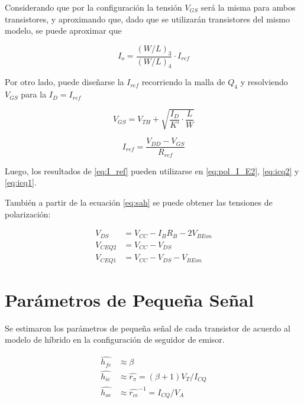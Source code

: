 Considerando que por la configuración la tensión $V_{GS}$ será la misma para ambos transistores, y aproximando que, dado que se utilizarán transistores del mismo modelo, se puede aproximar que 

\begin{equation}
    I_o = \frac{(W/L)_3}{(W/L)_4} \cdot I_{ref}
\end{equation}

Por otro lado, puede diseñarse la $I_{ref}$ recorriendo la malla de $Q_4$ y resolviendo $V_{GS}$ para la $I_D = I_{ref}$

\begin{equation}
    V_{GS} = V_{TH} + \sqrt{\frac{I_D}{K'}\cdot\frac{L}{W}}
\end{equation}

\begin{equation}
    I_{ref}=\frac{V_{DD}-V_{GS}}{R_{ref}}
    \label{eq:I_ref}
\end{equation}

Luego, los resultados de \eqref{eq:I_ref} pueden utilizarse en \eqref{eq:pol_I_E2}, \eqref{eq:icq2} y \eqref{eq:icq1}.

También a partir de la ecuación	 \eqref{eq:sah} se puede obtener las tensiones de polarización:

\begin{align}
    V_{DS} &= V_{CC} - I_B R_B - 2V_{BEon} \\
    V_{CEQ2} &= V_{CC} - V_{DS} \\
    V_{CEQ1} &= V_{CC} - V_{DS} - V_{BEon}
\end{align}

\section{Parámetros de Pequeña Señal}

Se estimaron los parámetros de pequeña señal de cada transistor de acuerdo al modelo de híbrido en la configuración de seguidor de emisor.

\begin{align}
    \hat{h_{fe}} &\approx \beta \\
    \hat{h_{ie}} &\approx \hat{r_\pi} = (\beta+1) V_T/I_{CQ} \\
    \hat{h_{oe}} &\approx \hat{r_{ce}}^{-1} = I_{CQ}/V_A
\end{align}


